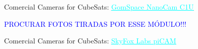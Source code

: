 
\begin{frame}{Comercial Cameras for CubeSats: \href{https://gomspace.com/shop/payloads/earth-observation.aspx}{\textcolor{cyan}{\underline{GomSpace NanoCam C1U}}}}

\textcolor{blue}{PROCURAR FOTOS TIRADAS POR ESSE MÓDULO!!!}

\end{frame}


\begin{frame}{Comercial Cameras for CubeSats: \href{https://www.skyfoxlabs.com/product/27-digital-cubesat-camera}{\textcolor{cyan}{\underline{SkyFox Labs piCAM}}}}


\end{frame}
